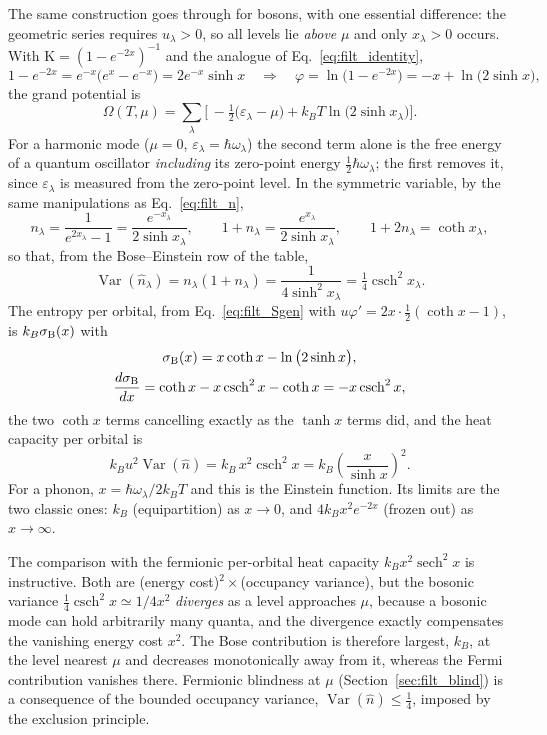 \documentclass[10pt,a4paper]{article}
\theoremstyle{plain}
\theoremstyle{remark}
\newcommand{\Var}{\operatorname{Var}}
\providecommand{\Kappa}{\mathrm{K}}
\begin{document}
The same construction goes through for bosons, with one essential difference: the
geometric series requires $ u_\lambda > 0 $, so all levels lie \emph{above} $ \mu $
and only $ x_\lambda > 0 $ occurs. With $ \Kappa = (1 - e^{-2x})^{-1} $ and the
analogue of Eq.~\eqref{eq:filt_identity},
\[
  1 - e^{-2x} = e^{-x}\big(e^{x} - e^{-x}\big) = 2e^{-x}\sinh x
  \quad\Longrightarrow\quad
  \varphi = \ln\big(1 - e^{-2x}\big) = -x + \ln\big(2\sinh x\big),
\]
the grand potential is
\[
  \Omega(T,\mu) = \sum_\lambda\Big[\,-\tfrac12\big(\varepsilon_\lambda - \mu\big)
  + k_BT\ln\big(2\sinh x_\lambda\big)\Big] .
\]
For a harmonic mode ($ \mu = 0 $, $ \varepsilon_\lambda = \hbar\omega_\lambda $) the
second term alone is the free energy of a quantum oscillator \emph{including} its
zero-point energy $ \tfrac12\hbar\omega_\lambda $; the first removes it, since
$ \varepsilon_\lambda $ is measured from the zero-point level. In the symmetric
variable, by the same manipulations as Eq.~\eqref{eq:filt_n},
\[
  n_\lambda = \frac{1}{e^{2x_\lambda} - 1} = \frac{e^{-x_\lambda}}{2\sinh x_\lambda},
  \qquad
  1 + n_\lambda = \frac{e^{x_\lambda}}{2\sinh x_\lambda},
  \qquad
  1 + 2n_\lambda = \coth x_\lambda ,
\]
so that, from the Bose--Einstein row of the table,
\[
  \Var(\hat n_\lambda) = n_\lambda(1 + n_\lambda) = \frac{1}{4\sinh^{2}x_\lambda}
  = \tfrac14\operatorname{csch}^{2}x_\lambda .
\]
The entropy per orbital, from Eq.~\eqref{eq:filt_Sgen} with $ u\varphi' = 2x\cdot
\tfrac12(\coth x - 1) $, is $ k_B\sigma_{\rm B}(x) $ with
\begin{gather*}
  \sigma_{\rm B}(x) = x\coth x - \ln\big(2\sinh x\big),
  \\
  \frac{d\sigma_{\rm B}}{dx} = \coth x - x\operatorname{csch}^{2}x - \coth x
  = -x\operatorname{csch}^{2}x ,
\end{gather*}
the two $ \coth x $ terms cancelling exactly as the $ \tanh x $ terms did, and the
heat capacity per orbital is
\[
  k_Bu^{2}\Var(\hat n) = k_B\,x^{2}\operatorname{csch}^{2}x
  = k_B\left(\frac{x}{\sinh x}\right)^{2} .
\]
For a phonon, $ x = \hbar\omega_\lambda/2k_BT $ and this is the Einstein function.
Its limits are the two classic ones: $ k_B $ (equipartition) as $ x \to 0 $, and
$ 4k_Bx^{2}e^{-2x} $ (frozen out) as $ x \to \infty $.

The comparison with the fermionic per-orbital heat capacity
$ k_Bx^{2}\operatorname{sech}^{2}x $ is instructive. Both are (energy cost)$
{}^{2}\times{} $(occupancy variance), but the bosonic variance $ \tfrac14\operatorname
{csch}^{2}x \simeq 1/4x^{2} $ \emph{diverges} as a level approaches $ \mu $, because a
bosonic mode can hold arbitrarily many quanta, and the divergence exactly
compensates the vanishing energy cost $ x^{2} $. The Bose contribution is
therefore largest, $ k_B $, at the level nearest $ \mu $ and decreases monotonically
away from it, whereas the Fermi contribution vanishes there. Fermionic blindness at $ \mu $
(Section~\ref{sec:filt_blind}) is a consequence of the bounded occupancy
variance, $ \Var(\hat n) \leq \tfrac14 $, imposed by the exclusion principle.
\end{document}
